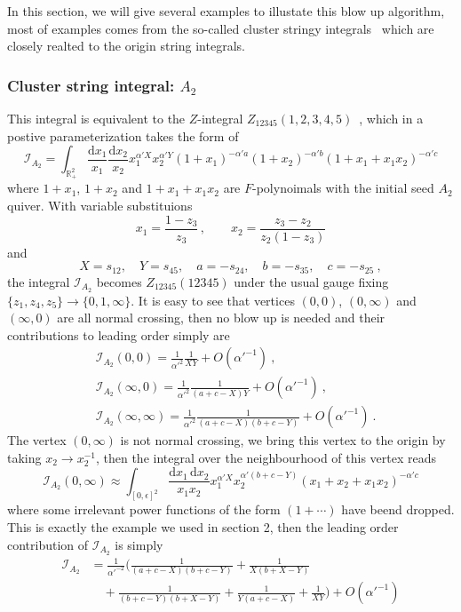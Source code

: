 \documentclass[12pt]{article}
\theoremstyle{definition}
\theoremstyle{plain}
\newcommand{\dif}{\mathrm{d}} %
\begin{document}
In this section, we will give several examples to illustate this blow up algorithm, most of examples comes from the so-called cluster stringy integrals~\cite{} which are closely realted to the origin string integrals.

\subsubsection*{Cluster string integral: $A_{2}$}
This integral is equivalent to the $Z$-integral $Z_{12345}(1,2,3,4,5)$~\cite{}, which in a postive parameterization takes the form of 
\[
	\mathcal{I}_{A_{2}}=\int_{\mathbb R_+^2} \frac{\dif x_1}{x_1}\frac{\dif x_2}{x_2}x_1^{\alpha' X}x_2^{\alpha' Y}
	(1+x_1)^{-\alpha' a}(1+x_2)^{-\alpha' b}(1+x_1+x_1x_2)^{-\alpha' c}
\] 
where $1+x_{1}$, $1+x_{2}$ and $1+x_{1}+x_{1}x_{2}$ are $F$-polynoimals with the initial seed $A_{2}$ quiver. With variable substituions
\[
	x_{1}=\frac{1-z_{3}}{z_{3}}\,,\qquad x_{2}=\frac{z_{3}-z_{2}}{z_{2}(1-z_{3})}
\]
and 
\[
	X=s_{12},\quad Y=s_{45},\quad a=-s_{24},\quad b=-s_{35},\quad c=-s_{25} \:,
	\] 
the integral $\mathcal{I}_{A_{2}}$ becomes $Z_{12345}(12345)$ under the usual gauge fixing $\{z_{1},z_{4},z_{5}\}\to\{0,1,\infty\}$. It is easy to see that vertices $(0,0)$, $(0,\infty)$ and $(\infty,0)$ are all normal crossing, then no blow up is needed and their contributions to leading order simply are
\begin{align*}
	&\mathcal{I}_{A_{2}}(0,0)=\frac{1}{\alpha'^{2}}\frac{1}{XY}+O(\alpha'^{-1}) \:, \\
	&\mathcal{I}_{A_{2}}(\infty,0)=\frac{1}{\alpha'^{2}}\frac{1}{(a+c-X)Y}+O(\alpha'^{-1}) \:, \\
	&\mathcal{I}_{A_{2}}(\infty,\infty)=\frac{1}{\alpha'^{2}}\frac{1}{(a+c-X)(b+c-Y)}+O(\alpha'^{-1}) \:.
\end{align*}
The vertex $(0,\infty)$ is not normal crossing, we bring this vertex to the origin by taking $x_{2}\to x_{2}^{-1}$, then the integral over the neighbourhood of this vertex reads
\[
    \mathcal{I}_{A_{2}}(0,\infty) \approx \int_{[0,\epsilon]^{2}} \frac{\dif x_{1}\,\dif x_{2}}{x_{1} x_{2}} x_{1}^{\alpha'X}x_{2}^{\alpha'(b+c-Y)}(x_{1}+x_{2}+x_{1}x_{2})^{-\alpha'c}
\]
where some irrelevant power functions of the form $(1+\cdots)$ have beend dropped. This is exactly the example we used in section 2, then the leading order contribution of $\mathcal{I}_{A_{2}}$ is simply
\begin{align*}
   \mathcal{I}_{A_2}&=\frac{1}{\alpha'^{-2}}\biggl(\frac{1}{(a+c-X) (b+c-Y)}+\frac{1}{X (b+X-Y)} \\
   &\quad +\frac{1}{(b+c-Y) (b+X-Y)}+\frac{1}{Y (a+c-X)}+\frac{1}{X Y}\biggr) + O(\alpha'^{-1}) 
\end{align*}
\end{document}
